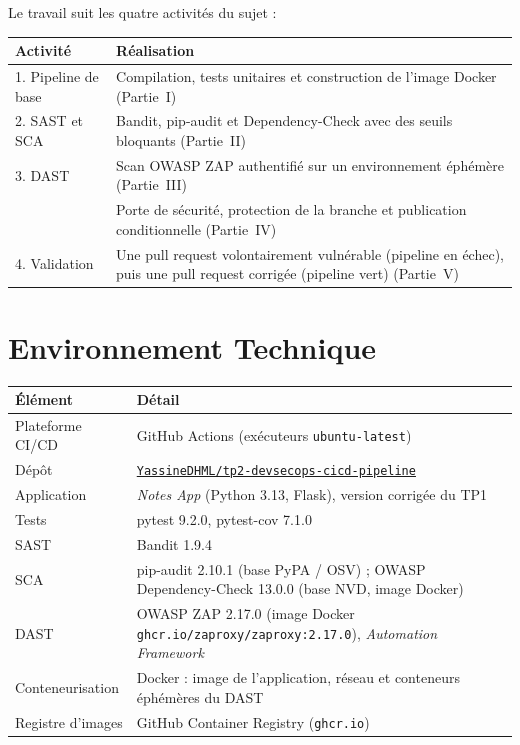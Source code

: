 \documentclass[11pt,a4paper]{article}
\newcommand{\code}[1]{\texttt{#1}}
\begin{document}
Le travail suit les quatre activités du sujet :

\begin{table}[H]
\centering
\begin{tabularx}{\textwidth}{@{}lL@{}}
\toprule
\textbf{Activité} & \textbf{Réalisation} \\
. Pipeline de base & Compilation, tests unitaires et construction de l'image Docker (Partie~I) \\
2. SAST et SCA & Bandit, pip-audit et Dependency-Check avec des seuils bloquants (Partie~II) \\
3. DAST & Scan OWASP ZAP authentifié sur un environnement éphémère (Partie~III) \\
   & Porte de sécurité, protection de la branche et publication conditionnelle (Partie~IV) \\
4. Validation & Une pull request volontairement vulnérable (pipeline en échec), puis une pull request corrigée (pipeline vert) (Partie~V) \\
\bottomrule
\end{tabularx}
\end{table}

\section{Environnement Technique}
\begin{table}[H]
\centering
\begin{tabularx}{\textwidth}{@{}lL@{}}
\toprule
\textbf{Élément} & \textbf{Détail} \\
\midrule
Plateforme CI/CD & GitHub Actions (exécuteurs \code{ubuntu-latest}) \\
Dépôt & \href{https://github.com/YassineDHML/tp2-devsecops-cicd-pipeline}{\code{YassineDHML/tp2-devsecops-cicd-pipeline}} \\
Application & \emph{Notes App} (Python 3.13, Flask), version corrigée du TP1 \\
Tests & pytest 9.2.0, pytest-cov 7.1.0 \\
SAST & Bandit 1.9.4 \\
SCA & pip-audit 2.10.1 (base PyPA / OSV) ; OWASP Dependency-Check 13.0.0 (base NVD, image Docker) \\
DAST & OWASP ZAP 2.17.0 (image Docker \code{ghcr.io/zaproxy/zaproxy:2.17.0}), \emph{Automation Framework} \\
Conteneurisation & Docker : image de l'application, réseau et conteneurs éphémères du DAST \\
Registre d'images & GitHub Container Registry (\code{ghcr.io}) \\
\bottomrule
\end{tabularx}
\end{table}
\end{document}

